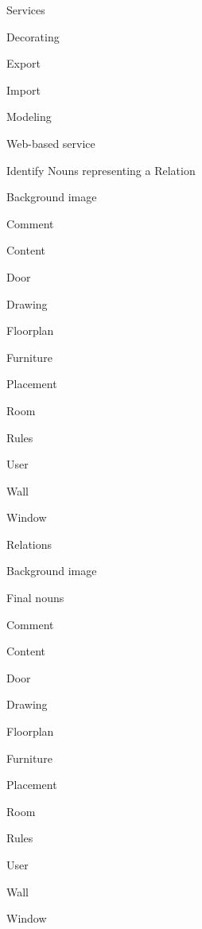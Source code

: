 \begin{paracol}{4}
			\bigskip
			Services
			\begin{compactitem}
				\item Decorating
				\item Export
				\item Import
				\item Modeling
				\item Web-based service
			\end{compactitem}
		
			\switchcolumn
			Identify Nouns representing a Relation\\
			\begin{compactitem}
				\item Background image
				\item Comment
				\item Content
				\item Door
				\item Drawing
				\item Floorplan
				\item Furniture
				\item Placement
				\item Room
				\item Rules
				\item User
				\item Wall
				\item Window
			\end{compactitem}
			
			\bigskip	
			Relations
			\begin{compactitem}
				\item Background image
			\end{compactitem}
		
			\switchcolumn
			Final nouns\\
			\begin{compactitem}
				\item Comment
				\item Content
				\item Door
				\item Drawing
				\item Floorplan
				\item Furniture
				\item Placement
				\item Room
				\item Rules
				\item User
				\item Wall
				\item Window
			\end{compactitem}
			
		\end{paracol}
	
\clearpage